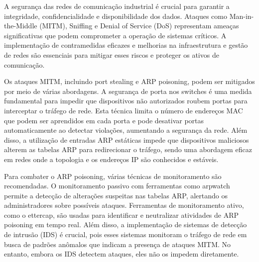 


A segurança das redes de comunicação industrial é crucial para garantir a integridade, confidencialidade e disponibilidade dos dados. Ataques como Man-in-the-Middle (MITM), Sniffing e Denial of Service (DoS) representam ameaças significativas que podem comprometer a operação de sistemas críticos. A implementação de contramedidas eficazes e melhorias na infraestrutura e gestão de redes são essenciais para mitigar esses riscos e proteger os ativos de comunicação.

Os ataques MITM, incluindo port stealing e ARP poisoning, podem ser mitigados por meio de várias abordagens. A segurança de porta nos switches é uma medida fundamental para impedir que dispositivos não autorizados roubem portas para interceptar o tráfego de rede. Esta técnica limita o número de endereços MAC que podem ser aprendidos em cada porta e pode desativar portas automaticamente ao detectar violações, aumentando a segurança da rede. Além disso, a utilização de entradas ARP estáticas impede que dispositivos maliciosos alterem as tabelas ARP para redirecionar o tráfego, sendo uma abordagem eficaz em redes onde a topologia e os endereços IP são conhecidos e estáveis.

Para combater o ARP poisoning, várias técnicas de monitoramento são recomendadas. O monitoramento passivo com ferramentas como arpwatch permite a detecção de alterações suspeitas nas tabelas ARP, alertando os administradores sobre possíveis ataques. Ferramentas de monitoramento ativo, como o ettercap, são usadas para identificar e neutralizar atividades de ARP poisoning em tempo real. Além disso, a implementação de sistemas de detecção de intrusão (IDS) é crucial, pois esses sistemas monitoram o tráfego de rede em busca de padrões anômalos que indicam a presença de ataques MITM. No entanto, embora os IDS detectem ataques, eles não os impedem diretamente.

